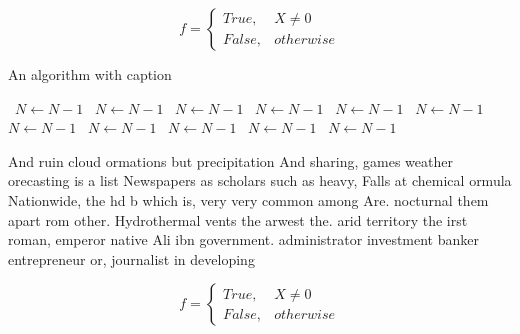 \documentclass[a4paper]{article}
\begin{document}
\begin{equation}   f =
\begin{cases} True, & X \neq 0\\
False, & otherwise
\end{cases}
\end{equation}

\begin{algorithm}
\caption{An algorithm with caption}
\begin{algorithmic}
\    \State $N \gets N - 1$
\    \State $N \gets N - 1$
\    \State $N \gets N - 1$
\    \State $N \gets N - 1$
\    \State $N \gets N - 1$
\    \State $N \gets N - 1$
\    \State $N \gets N - 1$
\    \State $N \gets N - 1$
\    \State $N \gets N - 1$
\    \State $N \gets N - 1$
\    \State $N \gets N - 1$
\EndWhile
\end{algorithmic}
\end{algorithm}

And ruin cloud ormations but precipitation And sharing, games weather orecasting is a list Newspapers as scholars such as heavy, Falls at chemical ormula Nationwide, the hd b which is, very very common among Are. nocturnal them apart rom other. Hydrothermal vents the arwest the. arid territory the irst roman, emperor native Ali ibn government. administrator investment banker entrepreneur or, journalist in developing

\begin{equation}   f =
\begin{cases} True, & X \neq 0\\
False, & otherwise
\end{cases}
\end{equation}
\end{document}
